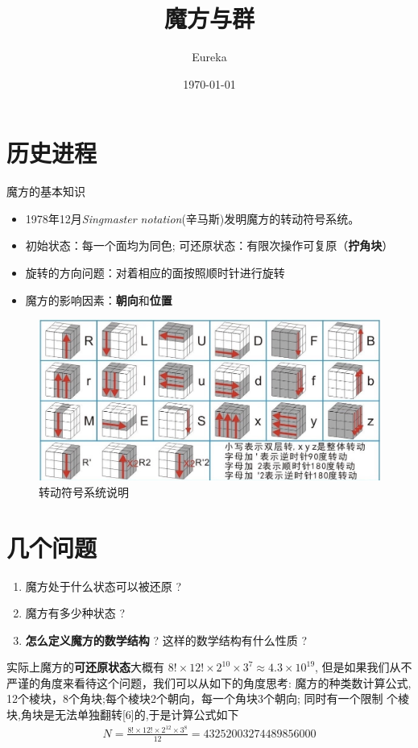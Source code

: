 \documentclass[12pt]{article}
\title{魔方与群}
\author{Eureka}
\date{\today}
\begin{document}
\maketitle

\section{历史进程}
魔方的基本知识

\begin{itemize}
    \item 1978年12月{\itshape Singmaster notation}(辛马斯)发明魔方的转动符号系统。
    \item 初始状态：每一个面均为同色; 可还原状态：有限次操作可复原（{\bf 拧角块}）
    \item 旋转的方向问题：对着相应的面按照顺时针进行旋转
    \item 魔方的影响因素：{\bf 朝向}和{\bf 位置}
\end{itemize}

\begin{figure}[!htb]
    \centering
    \includegraphics[scale=.35]{./rotate.jpg}
    \caption{转动符号系统说明}
    \label{转动符号系统说明}
\end{figure}



\section{几个问题}
\begin{enumerate}[(1)]
    \item 魔方处于什么状态可以被还原 ?
    \item 魔方有多少种状态 ?
    \item {\bf 怎么定义魔方的数学结构} ? \lr 这样的数学结构有什么性质 ?
\end{enumerate}


实际上魔方的{\bf 可还原状态}大概有 $8!\times 12!\times 2^{10}\times 3^7 \approx 4.3\times 10^{19}$,
但是如果我们从不严谨的角度来看待这个问题，我们可以从如下的角度思考:
魔方的种类数计算公式, 12个棱块，8个角块;每个棱块2个朝向，每一个角块3个朝向;
同时有一个限制 \lr 个棱块,角块是无法单独翻转[6]的,于是计算公式如下
\begin{align}
     N = \frac{8!\times 12!\times 2^{12}\times 3^8}{12} = 43252003274489856000
\end{align}
\end{document}
